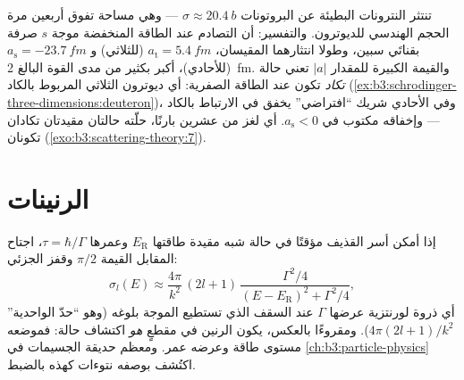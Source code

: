 \begin{example}\label{ex:b3:scattering-theory:np}
تنتثر النترونات البطيئة عن البروتونات  $\sigma \approx
\qty{20.4}{b}$ --- وهي مساحة تفوق أربعين مرة الحجم الهندسي
للديوترون. والتفسير: أن التصادم عند الطاقة المنخفضة موجة $s$ صرفة
بقناتَي سبين، وطولا انتثارهما المقيسان،
$a_{\text{t}} = \qty{5.4}{fm}$ (للثلاثي) و $a_{\text{s}} =
\qty{-23.7}{fm}$ (للأحادي)، أكبر بكثير من مدى القوة البالغ
\qty{2}{fm}. والقيمة الكبيرة للمقدار $|a|$ تعني حالة \emph{تكاد} تكون
عند الطاقة الصفرية: أي ديوترون الثلاثي المربوط بالكاد
(\cref{ex:b3:schrodinger-three-dimensions:deuteron})، وفي
الأحادي شريك ``افتراضي'' يخفق في الارتباط بالكاد --- وإخفاقه
مكتوب في $a_{\text{s}} < 0$. أي لغز من عشرين بارنًا،
حلّته حالتان مقيدتان تكادان تكونان
(\cref{exo:b3:scattering-theory:7}).
\end{example}

\section{الرنينات}

\begin{proposition}\label{prop:b3:scattering-theory:resonance}
إذا أمكن أسر القذيف مؤقتًا في حالة شبه مقيدة طاقتها
$E_{\text{R}}$ وعمرها $\tau = \hbar/\Gamma$،
اجتاح  المقابل القيمة $\pi/2$ وقفز 
الجزئي:
\[
\sigma_l(E) \approx \frac{4\pi}{k^2}\,(2l+1)\,
\frac{\Gamma^2/4}{(E - E_{\text{R}})^2 + \Gamma^2/4} ,
\]
أي ذروة لورنتزية عرضها $\Gamma$ عند السقف الذي تستطيع الموجة
بلوغه (وهو ``حدّ الواحدية'' $4\pi(2l+1)/k^2$). ومقروءًا بالعكس،
يكون الرنين في مقطعٍ \emph{هو} اكتشاف حالة:
فموضعه مستوى طاقة وعرضه عمر. ومعظم
حديقة الجسيمات في \cref{ch:b3:particle-physics} اكتُشف بوصفه
نتوءات كهذه بالضبط.
\end{proposition}
\admitted

